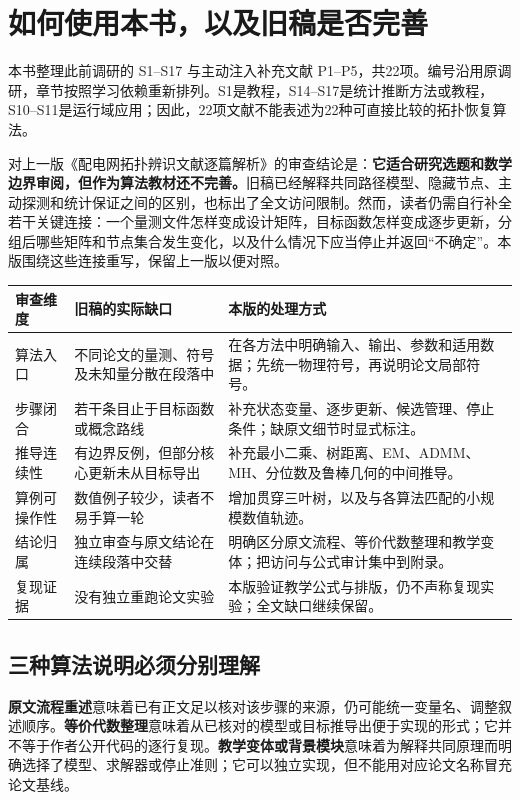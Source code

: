 \chapter*{如何使用本书，以及旧稿是否完善}
本书整理此前调研的 S1--S17 与主动注入补充文献 P1--P5，共22项。编号沿用原调研，章节按照学习依赖重新排列。S1是教程，S14--S17是统计推断方法或教程，S10--S11是运行域应用；因此，22项文献不能表述为22种可直接比较的拓扑恢复算法。

对上一版《配电网拓扑辨识文献逐篇解析》的审查结论是：\textbf{它适合研究选题和数学边界审阅，但作为算法教材还不完善。}旧稿已经解释共同路径模型、隐藏节点、主动探测和统计保证之间的区别，也标出了全文访问限制。然而，读者仍需自行补全若干关键连接：一个量测文件怎样变成设计矩阵，目标函数怎样变成逐步更新，分组后哪些矩阵和节点集合发生变化，以及什么情况下应当停止并返回“不确定”。本版围绕这些连接重写，保留上一版以便对照。

\begin{longtable}{p{}p{}p{}}
\toprule 审查维度 & 旧稿的实际缺口 & 本版的处理方式\\\midrule
\endhead
算法入口 & 不同论文的量测、符号及未知量分散在段落中 & 在各方法中明确输入、输出、参数和适用数据；先统一物理符号，再说明论文局部符号。\\
步骤闭合 & 若干条目止于目标函数或概念路线 & 补充状态变量、逐步更新、候选管理、停止条件；缺原文细节时显式标注。\\
推导连续性 & 有边界反例，但部分核心更新未从目标导出 & 补充最小二乘、树距离、EM、ADMM、MH、分位数及鲁棒几何的中间推导。\\
算例可操作性 & 数值例子较少，读者不易手算一轮 & 增加贯穿三叶树，以及与各算法匹配的小规模数值轨迹。\\
结论归属 & 独立审查与原文结论在连续段落中交替 & 明确区分原文流程、等价代数整理和教学变体；把访问与公式审计集中到附录。\\
复现证据 & 没有独立重跑论文实验 & 本版验证教学公式与排版，仍不声称复现实验；全文缺口继续保留。\\
\bottomrule
\end{longtable}

\section*{三种算法说明必须分别理解}
\textbf{原文流程重述}意味着已有正文足以核对该步骤的来源，仍可能统一变量名、调整叙述顺序。\textbf{等价代数整理}意味着从已核对的模型或目标推导出便于实现的形式；它并不等于作者公开代码的逐行复现。\textbf{教学变体或背景模块}意味着为解释共同原理而明确选择了模型、求解器或停止准则；它可以独立实现，但不能用对应论文名称冒充论文基线。

